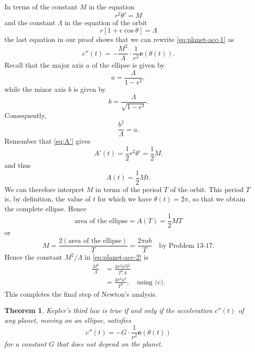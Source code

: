 \documentclass{article}
\numberwithin{corollary}{subsection}
\numberwithin{definition}{subsection}
\numberwithin{lemma}{subsection}
\newtheorem{theorem}{Theorem}
\numberwithin{theorem}{subsection}
\begin{document}
In terms of the constant $M$ in the equation \[
  r^2\theta' = M
\] and the constant $\Lambda$ in the equation of the orbit \[
  r[1 + \epsilon \cos \theta] = \Lambda
\] the last equation in our proof shows that we can rewrite
\eqref{eq:planet-acc-1} as
\begin{equation} \label{eq:planet-acc-2} \tag{**}
  c''(t) = -\frac{M^2}{\Lambda} \cdot \frac{1}{r^2}\mathbf{e}(\theta(t)).
\end{equation}
Recall that the major axis $a$ of the ellipse is given by
\begin{equation} \label{eq:ell-a} \tag{a}
  a = \frac{\Lambda}{1 - \epsilon^2},
\end{equation}
while the minor axis $b$ is given by
\begin{equation} \label{eq:ell-b} \tag{b}
  b = \frac{\Lambda}{\sqrt{1 - \epsilon^2}}.
\end{equation}
Consequently,
\begin{equation} \label{eq:ell-c} \tag{c}
  \frac{b^2}{\Lambda} = a.
\end{equation}
Remember that \eqref{eq:A'} gives \[
  A'(t) = \frac{1}{2}r^2\theta' = \frac{1}{2}M.
\] and thus \[
  A(t) = \frac{1}{2}Mt.
\] We can therefore interpret $M$ in terms of the period $T$ of the orbit. This
period $T$ is, by definition, the value of $t$ for which we have $\theta(t) =
2\pi$, so that we obtain the complete ellipse. Hence \[
  \text{area of the ellipse} = A(T) = \frac{1}{2}MT
\] or \[
  M = \frac{2(\text{area of the ellipse})}{T} = \frac{2 \pi ab}{T} \quad
  \text{by Problem 13-17}.
\] Hence the constant $M^2/\Lambda$ in \eqref{eq:planet-acc-2} is
\begin{align*}
  \frac{M^2}{\Lambda}
  &= \frac{4 \pi^2 a^2 b^2}{T^2 \Lambda} \\
  &= \frac{4 \pi^2 a^3}{T^2}, \quad \text{using (c)}.
\end{align*} This completes the final step of Newton's analysis.

\begin{theorem}
  Kepler's third law is true if and only if the acceleration $c''(t)$ of any
  planet, moving on an ellipse, satisfies \[
    c''(t) = -G \cdot \frac{1}{r^2} \mathbf{e}(\theta(t))
  \] for a constant $G$ that does not depend on the planet.
\end{theorem}
\end{document}

